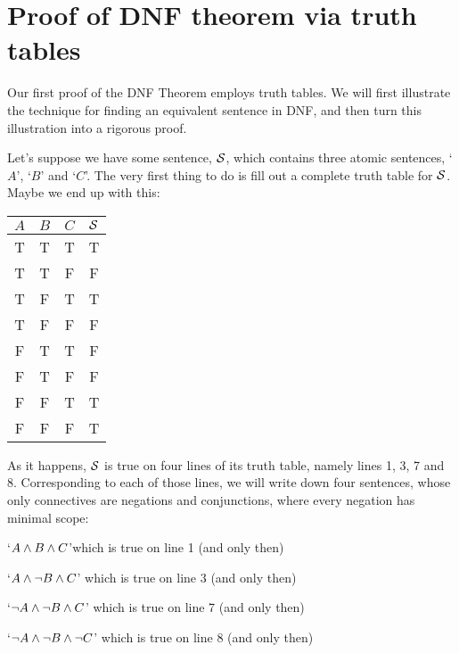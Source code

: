 \section{Proof of DNF theorem via truth tables}
\label{s:DNFTruthTable}

Our first proof of the DNF Theorem employs truth tables. We will first illustrate the technique for finding an equivalent sentence in DNF, and then turn this illustration into a rigorous proof. 

Let's suppose we have some sentence, $\mathcal{S}$, which contains three atomic sentences, `$A$', `$B$' and `$C$'. The very first thing to do is fill out a complete truth table for $\mathcal{S}$. Maybe we end up with this:
\begin{center}
\begin{tabular}{c c c | c}
$A$ & $B$ & $C$ & $\mathcal{S}$\\
\hline
 T & T & T & T \\
 T & T & F & F \\
 T & F & T & T \\
 T & F & F & F \\
 F & T & T & F \\
 F & T & F & F \\
 F & F & T & T \\
 F & F & F & T
\end{tabular}
\end{center}
%
%
As it happens, $\mathcal{S}$ is true on four lines of its truth table, namely lines 1, 3, 7 and 8. Corresponding to each of those lines, we will write down four sentences, whose only connectives are negations and conjunctions, where every negation has minimal scope:
	\begin{earg}
		\item  `$A \wedge B \wedge C$'\hfill which is true on line 1 (and only then)
		\item `$A \wedge \neg B \wedge C$' \hfill which is true on line 3 (and only then)
		\item `$\neg A \wedge \neg B \wedge C$' \hfill which is true on line 7 (and only then)
		\item `$\neg A \wedge \neg B \wedge \neg C$' \hfill which is true on line 8 (and only then)
	\end{earg}
